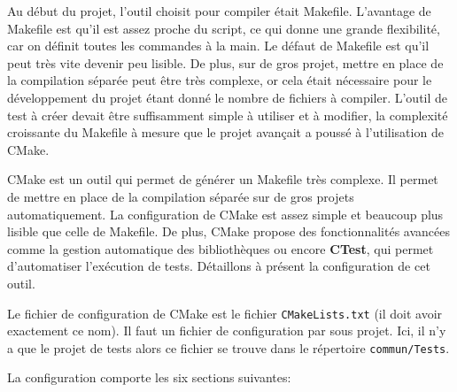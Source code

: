 \documentclass[a4paper]{article}
\begin{document}
Au début du projet, l'outil choisit pour compiler était Makefile. L'avantage de
Makefile est qu'il est assez proche du script, ce qui donne une grande
flexibilité, car on définit toutes les commandes à la main. Le défaut de Makefile
est qu'il peut très vite devenir peu lisible. De plus, sur de gros projet, mettre
en place de la compilation séparée peut être très complexe, or cela était
nécessaire pour le développement du projet étant donné le nombre de fichiers à
compiler. L'outil de test à créer devait être suffisamment simple à utiliser et à
modifier, la complexité croissante du Makefile à mesure que le projet avançait a
poussé à l'utilisation de CMake.

CMake est un outil qui permet de générer un Makefile très complexe. Il permet de
mettre en place de la compilation séparée sur de gros projets automatiquement.
La configuration de CMake est assez simple et beaucoup plus lisible que celle de
Makefile. De plus, CMake propose des fonctionnalités avancées comme la gestion
automatique des bibliothèques ou encore \textbf{CTest}, qui permet d'automatiser
l'exécution de tests. Détaillons à présent la configuration de cet outil.

Le fichier de configuration de CMake est le fichier \verb|CMakeLists.txt|
(il doit avoir exactement ce nom). Il faut un fichier de configuration par sous
projet. Ici, il n'y a que le projet de tests alors ce fichier se trouve dans le
répertoire \verb|commun/Tests|.

La configuration comporte les six sections suivantes:
\end{document}
